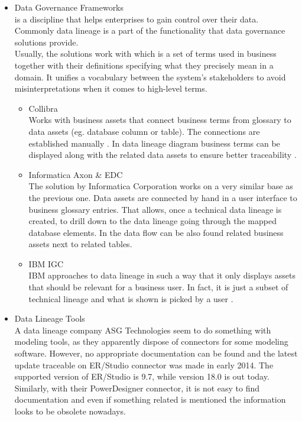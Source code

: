 \begin{itemize}
	\item Data Governance Frameworks \\ 
	 is a discipline that helps enterprises to gain control over their data. Commonly data lineage is a part of the functionality that data governance solutions provide. \\
	Usually, the solutions work with  which is a set of terms used in business together with their definitions specifying what they precisely mean in a domain. It unifies a vocabulary between the system's stakeholders to avoid misinterpretations when it comes to high-level terms. 
	\begin{itemize}
		\item Collibra \\ 
		Works with business assets that connect business terms from glossary to data assets (eg. database column or table). The connections are established manually \cite{CollibraBusinessAssets}. In data lineage diagram business terms can be displayed along with the related data assets to ensure better traceability \cite{CollibraVisualization}.
		\item Informatica Axon \& EDC \\ 
		The solution by Informatica Corporation works on a very similar base as the previous one.
		Data assets are connected by hand in a user interface to business glossary entries\cite{InformaticaBusinessAssets}. That allows, once a technical data lineage is created, to drill down to the data lineage going through the mapped database elements. In the data flow can be also found related business assets next to related tables.
		\item IBM IGC \\ 
		IBM approaches to data lineage in such a way that it only displays assets that should be relevant for a business user. In fact, it is just a subset of technical lineage and what is shown is picked by a user \cite{IbmIgcBusinessLineage}.
	\end{itemize}
	\item Data Lineage Tools \\ 
	A data lineage company ASG Technologies seem to do something with modeling tools, as they apparently dispose of connectors for some modeling software. However, no appropriate documentation can be found and the latest update traceable on ER/Studio connector was made in early 2014. \cite{AsgErStudio}
	The supported version of ER/Studio is 9.7, while version 18.0 is out today.
	Similarly, with their PowerDesigner connector, it is not easy to find documentation and even if something related is mentioned the information looks to be obsolete nowadays.
	

\end{itemize}
